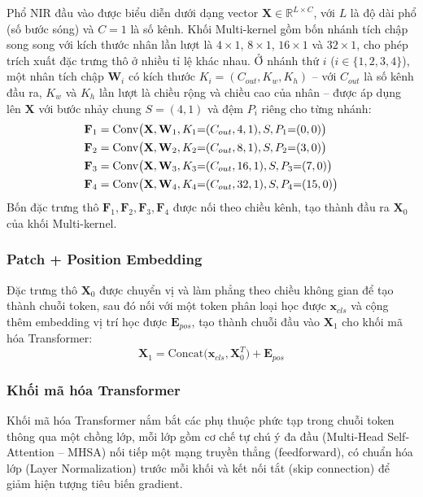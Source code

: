 \documentclass[10pt,twocolumn,twoside]{article}
\begin{document}
Phổ NIR đầu vào được biểu diễn dưới dạng vector $\mathbf{X} \in \mathbb{R}^{L \times C}$,
với $L$ là độ dài phổ (số bước sóng) và $C = 1$ là số kênh. Khối Multi-kernel
gồm bốn nhánh tích chập song song với kích thước nhân lần lượt là
$4 \times 1$, $8 \times 1$, $16 \times 1$ và $32 \times 1$, cho phép trích
xuất đặc trưng thô ở nhiều tỉ lệ khác nhau. Ở nhánh thứ $i$ ($i \in
\{1,2,3,4\}$), một nhân tích chập $\mathbf{W}_i$ có kích thước $K_i =
(C_{out}, K_w, K_h)$ -- với $C_{out}$ là số kênh đầu ra, $K_w$ và $K_h$ lần
lượt là chiều rộng và chiều cao của nhân -- được áp dụng lên $\mathbf{X}$
với bước nhảy chung $S = (4,1)$ và đệm $P_i$ riêng cho từng nhánh:
\begin{align}
\mathbf{F}_1 &= \mathrm{Conv}\big(\mathbf{X}, \mathbf{W}_1, K_1{=}(C_{out},4,1), S, P_1{=}(0,0)\big) \notag\\
\mathbf{F}_2 &= \mathrm{Conv}\big(\mathbf{X}, \mathbf{W}_2, K_2{=}(C_{out},8,1), S, P_2{=}(3,0)\big) \notag\\
\mathbf{F}_3 &= \mathrm{Conv}\big(\mathbf{X}, \mathbf{W}_3, K_3{=}(C_{out},16,1), S, P_3{=}(7,0)\big) \notag\\
\mathbf{F}_4 &= \mathrm{Conv}\big(\mathbf{X}, \mathbf{W}_4, K_4{=}(C_{out},32,1), S, P_4{=}(15,0)\big)
\label{eq:multikernel}
\end{align}
Bốn đặc trưng thô $\mathbf{F}_1, \mathbf{F}_2, \mathbf{F}_3, \mathbf{F}_4$
được nối theo chiều kênh, tạo thành đầu ra $\mathbf{X}_0$ của khối
Multi-kernel.

\subsubsection{Patch + Position Embedding}

Đặc trưng thô $\mathbf{X}_0$ được chuyển vị và làm phẳng theo chiều không
gian để tạo thành chuỗi token, sau đó nối với một token phân loại học được
$\mathbf{x}_{cls}$ và cộng thêm embedding vị trí học được $\mathbf{E}_{pos}$,
tạo thành chuỗi đầu vào $\mathbf{X}_1$ cho khối mã hóa Transformer:
\begin{equation}
\mathbf{X}_1 = \mathrm{Concat}\big(\mathbf{x}_{cls}, \mathbf{X}_0^{T}\big) + \mathbf{E}_{pos}
\label{eq:posemb}
\end{equation}

\subsubsection{Khối mã hóa Transformer}

Khối mã hóa Transformer nắm bắt các phụ thuộc phức tạp trong chuỗi token
thông qua một chồng lớp, mỗi lớp gồm cơ chế tự chú ý đa đầu (Multi-Head
Self-Attention -- MHSA) nối tiếp một mạng truyền thẳng (feedforward), có
chuẩn hóa lớp (Layer Normalization) trước mỗi khối và kết nối tắt (skip
connection) để giảm hiện tượng tiêu biến gradient.
\end{document}
